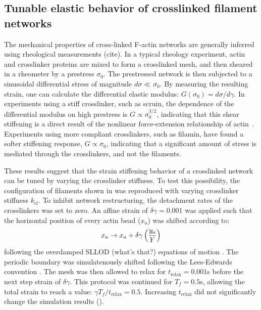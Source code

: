 \documentclass[11pt]{article}
\begin{document}
\subsection*{Tunable elastic behavior of crosslinked filament networks}
\par
The {\color{red}mechanical} properties of cross-linked F-actin networks are generally {\color{red}inferred} using rheological {\color{red}measurements} {\color{red}(cite)}. In a {\color{red}typical rheology}
experiment, actin and crosslinker proteins are mixed {\color{red}to} form a crosslinked mesh, {\color{red}and then} sheared in a rheometer by a prestress $\sigma_0$. The prestressed network {\color{red}is} then {\color{red}subjected to} a sinusoidal differential stress of magnitude
$d\sigma\ll\sigma_0$. By measuring the resulting strain, one can calculate the
differential elastic modulus: $G(\sigma_0) = d\sigma/d\gamma$. 
In experiments using a stiff crosslinker, such as scruin, the dependence of the differential modulus on high prestress 
is $G\propto\sigma_0^{3/2}$, indicating that this shear stiffening is a direct result of the nonlinear {\color{red}force-extension relationship} of actin~\cite{gardel2004,lin2010}. Experiments using more compliant crosslinkers, such as filamin, have found a softer
stiffening response, $G\propto\sigma_0$, indicating that a significant amount of stress is {\color{red}mediated through} the crosslinkers,
and not the {\color{red}filaments}\cite{kasza2009}.
\par 
These results suggest that the {\color{red}strain} stiffening behavior of a crosslinked network can be tuned by varying the crosslinker
stiffness. To test this possibility, the configuration of filaments shown in  was reproduced with varying crosslinker stiffness $k_\text{cl}$. 
To inhibit network restructuring, the detachment rates of the crosslinkers was set to zero. An affine strain of $\delta\gamma=0.001$ was applied such that the horizontal position of every actin bead ($x_a$) was shifted {\color{red}according to:}
\begin{equation}
  x_a \rightarrow x_a + \delta\gamma \left( {y_a\over Y} \right)
  \label{eqn:sllod}
\end{equation} 
following the overdamped SLLOD {\color{blue}(what's that?)} equations of motion \cite{evans1984}. The periodic boundary was simulatenously shifted
following the Lees-Edwards convention \cite{allen}. The mesh was then allowed to relax for $t_\text{relax} =
0.001$s before the next step strain of $\delta\gamma$. This {\color{red}protocol} was {\color{red}continued} for $T_f=0.5$s, {\color{red}allowing} the total strain {\color{red}to reach a value}: $\gamma T_f/t_\text{relax}=0.5$. Increasing $t_\text{relax}$ did not significantly change the simulation results ().  
\end{document}
